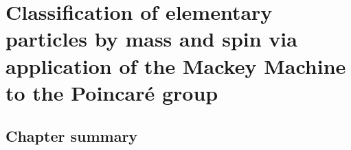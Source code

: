 

\chapter{Classification of elementary particles by mass and spin via application of the Mackey Machine to the Poincaré group}
\setcounter{theorem}{0}
\setcounter{equation}{0}

\renewcommand{\theenumi}{\roman{enumi}}
\renewcommand{\labelenumi}{\textnormal{(\theenumi)}$\;\;$}


\section{Chapter summary}


